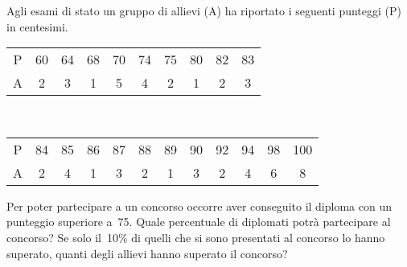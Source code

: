 \begin{esercizio}
\label{ese:3.97}
Agli esami di stato un gruppo di allievi (A) ha riportato i seguenti 
punteggi  (P) in centesimi.\\ [.5em]
\begin{tabular}{cccccccccc}
\hline
P& 60& 64& 68& 70& 74& 75& 80& 82& 83\\
A& 2& 3& 1& 5& 4& 2& 1& 2& 3\\
\hline
\end{tabular}\\ %
\begin{tabular}{cccccccccccc}
\hline
P& 84& 85& 86& 87& 88& 89& 90& 92& 94& 
98& 100\\
A& 2& 4& 1& 3& 2& 1& 3& 2& 4& 6& 8\\
\hline
\end{tabular}

\vspace{-.5em}
\vspace*{-1em}

Per poter partecipare a un concorso occorre aver conseguito il diploma con 
un  punteggio superiore a~75. Quale percentuale di diplomati
potrà partecipare al concorso? Se solo il~10\% di quelli che si sono 
presentati al concorso lo hanno superato, quanti degli allievi hanno 
superato il concorso?
\end{esercizio}

